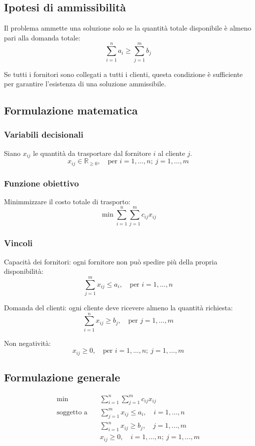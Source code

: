 \subsection{Ipotesi di ammissibilità}
Il problema ammette una soluzione solo se la quantità totale disponibile 
è almeno pari alla domanda totale:
\[
\sum_{i=1}^{n} a_i \geq \sum_{j=1}^{m} b_j
\]

Se tutti i fornitori sono collegati a tutti i clienti, questa condizione 
è sufficiente per garantire l'esistenza di una soluzione ammissibile.

\subsection{Formulazione matematica}
\subsubsection{Variabili decisionali}
Siano $x_{ij}$ le quantità da trasportare dal fornitore $i$ al cliente $j$.
\[
x_{ij} \in \mathbb{R}_{\geq 0}, \quad \text{per } i = 1, \dots, n; \ j = 1, \dots, m
\]

\subsubsection{Funzione obiettivo}
Minimmizzare il costo totale di trasporto:
\[
\min \sum_{i=1}^{n} \sum_{j=1}^{m} c_{ij} x_{ij}
\]

\subsubsection{Vincoli}
Capacità dei fornitori: ogni fornitore non può spedire più della propria disponibilità:
\[
\sum_{j=1}^{m} x_{ij} \leq a_i, \quad \text{per } i = 1, \dots, n
\]

Domanda del clienti: ogni cliente deve ricevere almeno la quantità richiesta:
\[
\sum_{i=1}^{n} x_{ij} \geq b_j, \quad \text{per } j = 1, \dots, m
\]

Non negatività:
\[
x_{ij} \geq 0, \quad \text{per } i = 1, \dots, n; \ j = 1, \dots, m
\]

\subsection{Formulazione generale}
\[
\begin{aligned}
\min \quad & \sum_{i=1}^{n} \sum_{j=1}^{m} c_{ij} x_{ij} \\
\text{soggetto a} \quad 
& \sum_{j=1}^{m} x_{ij} \leq a_i, \quad i = 1, \dots, n \\
& \sum_{i=1}^{n} x_{ij} \geq b_j, \quad j = 1, \dots, m \\
& x_{ij} \geq 0, \quad i = 1, \dots, n; \ j = 1, \dots, m
\end{aligned}
\]


